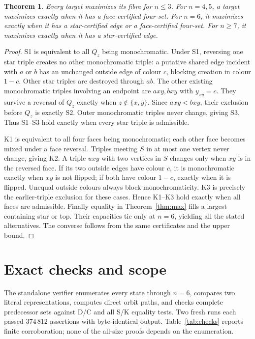\documentclass[a4paper,10pt]{amsart}
\newtheorem{theorem}{Theorem}[section]
\theoremstyle{remark}
\begin{document}
\begin{theorem}\label{thm:equality}
Every target maximizes its fibre for $n\le3$. For $n=4,5$, a target
maximizes exactly when it has a face-certified four-set. For $n=6$, it
maximizes exactly when it has a star-certified edge or a face-certified
four-set. For $n\ge7$, it maximizes exactly when it has a star-certified edge.
\end{theorem}
\begin{proof}
S1 is equivalent to all $Q_z$ being monochromatic. Under S1, reversing
one star triple creates no other monochromatic triple: a putative shared
edge incident with $a$ or $b$ has an unchanged outside edge of colour
$c$, blocking creation in colour $1-c$. Other star triples are destroyed
through $ab$. The other existing monochromatic triples involving an
endpoint are $axy,bxy$ with $y_{xy}=c$. They survive a reversal of $Q_z$
exactly when $z\notin\{x,y\}$. Since $axy<bxy$, their exclusion before
$Q_z$ is exactly S2. Outer monochromatic triples never change, giving S3.
Thus S1--S3 hold exactly when every star triple is admissible.

K1 is equivalent to all four faces being monochromatic; each other face
becomes mixed under a face reversal. Triples meeting $S$ in at most one
vertex never change, giving K2. A triple $uxy$ with two vertices in $S$
changes only when $xy$ is in the reversed face. If its two outside edges
have colour $c$, it is monochromatic exactly when $xy$ is not flipped;
if both have colour $1-c$, exactly when it is flipped. Unequal outside
colours always block monochromaticity. K3 is precisely the earlier-triple
exclusion for these cases. Hence K1--K3 hold exactly when all faces are
admissible. Finally equality in Theorem~\ref{thm:max} fills a largest
containing star or top. Their capacities tie only at $n=6$, yielding all
the stated alternatives. The converse follows from the same certificates
and the upper bound.
\end{proof}

\section{Exact checks and scope}

The standalone verifier enumerates every state through $n=6$, compares
two literal representations, computes direct orbit paths, and checks
complete predecessor sets against D/C and all S/K equality tests.
Two fresh runs each passed $374\,812$ assertions with byte-identical
output. Table~\ref{tab:checks} reports finite corroboration; none of the
all-size proofs depends on the enumeration.
\end{document}
